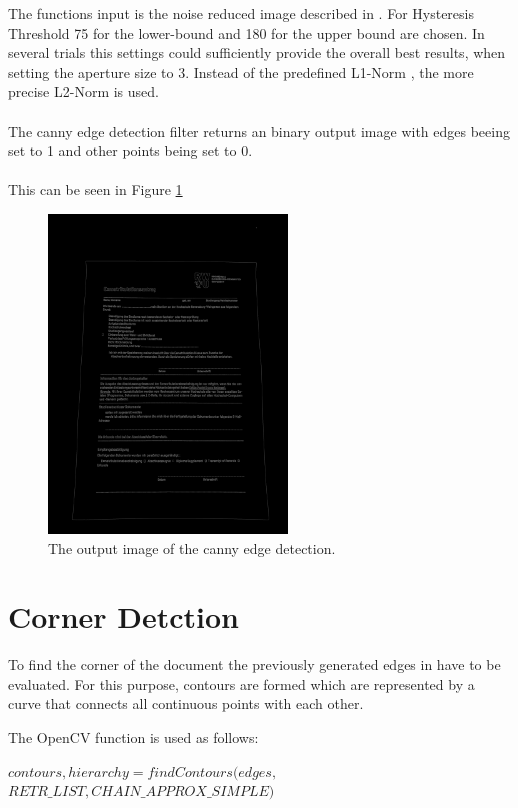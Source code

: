\documentclass[twocolumn,10pt]{asme2ej}
\begin{document}
\noindent
The functions input is the noise reduced image described in .
For Hysteresis Threshold 75 for the lower-bound and 180 for the upper bound are chosen.
In several trials this settings could sufficiently provide the overall best results, 
when setting the aperture size to 3.
Instead of the predefined L1-Norm \cite{l1_norm}, the more precise L2-Norm\cite{l2_norm} is used.
\\\\
The canny edge detection filter returns an binary output image with edges
beeing set to 1 and other points being set to 0.
\\\\
This can be seen in Figure \ref{fig:canny}

\begin{figure}[H]
\centerline{\includegraphics[width=2.5in]{output/hoch_3_4_canny.jpg}}
\caption{The output image of the canny edge detection.}
\label{fig:canny}
\end{figure}

\section{Corner Detction}
To find the corner of the document the previously generated edges 
in  have to be evaluated.
For this purpose, contours are formed which are represented by a curve that connects all 
continuous points with each other.\cite{SUZUKI198532}

The OpenCV function\cite{opencv_findcontours} is used as follows:
\begin{center}
    \noindent
    $contours, hierarchy = findContours(edges,$\\
    $RETR\_LIST, CHAIN\_APPROX\_SIMPLE)$
\end{center}
\end{document}
